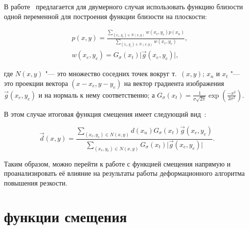 В работе~\cite{gusev2016parallel} предлагается для двумерного случая использовать функцию близости одной переменной для построения функции близости на плоскости:

\begin{align*}
	&p\left(x,y\right) = \frac{\sum_{\left(x_e,y_e\right) \in N\left(x,y\right)}{w\left(x_e,y_e\right)p\left(x_n\right)}} {\sum_{\left(x_e,y_e\right) \in N\left(x,y\right)}{w\left(x_e,y_e\right)}}, \\
	&w\left(x_e,y_e\right) = G_{\sigma}\left(x_t\right)\lvert \vec{g}\left(x_e,y_e\right) \rvert,
\end{align*}

\noindent где $N\left(x,y\right)$ "--- это множество соседних точек вокруг т.~$\left(x, y\right)$; $x_n$ и $x_t$ "--- это проекции вектора $\left(x-x_e, y-y_e\right)$ на вектор градиента изображения $\vec{g}\left(x_e,y_e\right)$ и на нормаль к нему соответственно; а $G_{\sigma}\left(x_t\right) = \frac{1}{\sigma \sqrt{2\pi}} \exp\left(\frac{-x^2}{2\sigma^2}\right)$.

В этом случае итоговая функция смещения имеет следующий вид~\cite{gusev2016parallel}:

\begin{equation*}
	\vec{d}\left(x,y\right) = \frac{\sum_{\left(x_e,y_e\right) \in N\left(x,y\right)}{d\left(x_n\right) G_{\sigma}\left(x_t\right) \vec{g}\left(x_e,y_e\right) }} {\sum_{\left(x_e,y_e\right) \in N\left(x,y\right)}{G_{\sigma}\left(x_t\right)\lvert \vec{g}\left(x_e,y_e\right) \rvert}}.
\end{equation*}

Таким образом, можно перейти к работе с функцией смещения напрямую и проанализировать её влияние на результаты работы деформационного алгоритма повышения резкости.

\section{ функции смещения}


